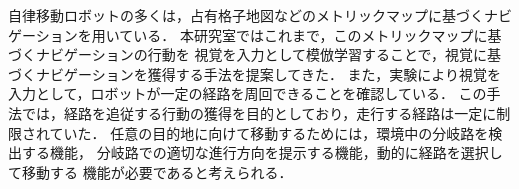%
自律移動ロボットの多くは，占有格子地図などのメトリックマップに基づくナビゲーションを用いている．
本研究室ではこれまで，このメトリックマップに基づくナビゲーションの行動を
視覚を入力として模倣学習することで，視覚に基づくナビゲーションを獲得する手法を提案してきた．
また，実験により視覚を入力として，ロボットが一定の経路を周回できることを確認している．
この手法では，経路を追従する行動の獲得を目的としており，走行する経路は一定に制限されていた．
任意の目的地に向けて移動するためには，環境中の分岐路を検出する機能，
分岐路での適切な進行方向を提示する機能，動的に経路を選択して移動する
機能が必要であると考えられる．

